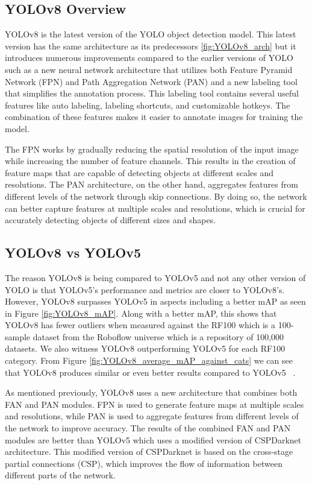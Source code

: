 \documentclass[10pt,twocolumn,letterpaper]{article}
\begin{document}
\subsection{YOLOv8 Overview}
YOLOv8 is the latest version of the YOLO object detection model. This latest version has the same architecture as its predecessors \ref{fig:YOLOv8_arch} but it introduces numerous improvements compared to the earlier versions of YOLO such as a new neural network architecture that utilizes both Feature Pyramid Network (FPN) and Path Aggregation Network (PAN) and a new labeling tool that simplifies the annotation process. This labeling tool contains several useful features like auto labeling, labeling shortcuts, and customizable hotkeys. The combination of these features makes it easier to annotate images for training the model.

The FPN works by gradually reducing the spatial resolution of the input image while increasing the number of feature channels. This results in the creation of feature maps that are capable of detecting objects at different scales and resolutions. The PAN architecture, on the other hand, aggregates features from different levels of the network through skip connections. By doing so, the network can better capture features at multiple scales and resolutions, which is crucial for accurately detecting objects of different sizes and shapes. ~\cite{CompReview}

\subsection{YOLOv8 vs YOLOv5}
The reason YOLOv8 is being compared to YOLOv5 and not any other version of YOLO is that YOLOv5’s performance and metrics are closer to YOLOv8’s. However, YOLOv8 surpasses YOLOv5 in aspects including a better mAP as seen in Figure \ref{fig:YOLOv8_mAP}. Along with a better mAP, this shows that YOLOv8 has fewer outliers when measured against the RF100 which is a 100-sample dataset from the Roboflow universe which is a repository of 100,000 datasets. We also witness YOLOv8 outperforming YOLOv5 for each RF100 category. From Figure \ref{fig:YOLOv8_average_mAP_against_cats} we can see that YOLOv8 produces similar or even better results compared to YOLOv5 ~\cite{YOLOv8Website}.

As mentioned previously, YOLOv8 uses a new architecture that combines both FAN and PAN modules. FPN is used to generate feature maps at multiple scales and resolutions, while PAN is used to aggregate features from different levels of the network to improve accuracy. The results of the combined FAN and PAN modules are better than YOLOv5 which uses a modified version of CSPDarknet architecture. This modified version of CSPDarknet is based on the cross-stage partial connections (CSP), which improves the flow of information between different parts of the network.
\end{document}

